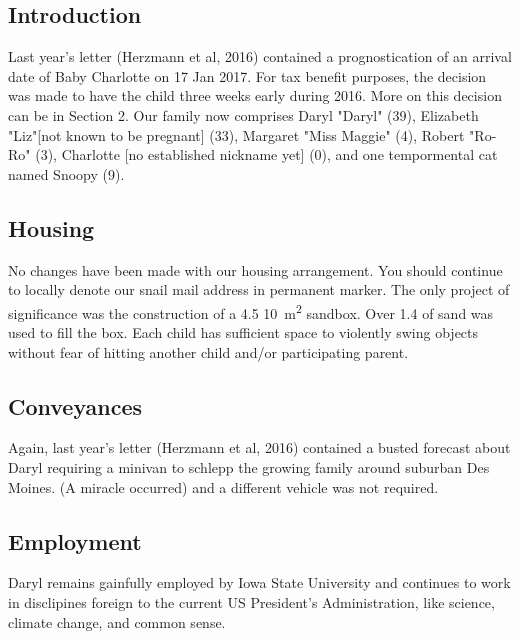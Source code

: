 \documentclass[letterpaper,11pt]{article}
\begin{document}
\begin{multicols}{2}

\section{Introduction} 

Last year's letter (Herzmann et al, 2016) contained a prognostication of an
arrival date of Baby Charlotte on 17 Jan 2017.  For tax benefit purposes, the
decision was made to have the child three weeks early during 2016. More on this
decision can be in Section 2. Our family now comprises Daryl "Daryl" (39),
Elizabeth "Liz"[not known to be pregnant] (33), Margaret "Miss Maggie" (4),
Robert "Ro-Ro" (3), Charlotte [no established nickname yet] (0), and one
tempormental cat named Snoopy (9).

\subsection{Housing}

No changes have been made with our housing arrangement. You should continue
to locally denote our snail mail address in permanent marker. The only project
of significance was the construction of a 4.5 \SI{10}{m^{2}} sandbox. Over 1.4
 of sand was used to fill the box.  Each child has sufficient space to
violently swing objects without fear of hitting another child and/or
participating parent.

\subsection{Conveyances}

Again, last year's letter (Herzmann et al, 2016) contained a busted forecast
about Daryl requiring a minivan to schlepp the growing family around suburban
Des Moines. (A miracle occurred) and a different vehicle was not required.

\subsection{Employment}
Daryl remains gainfully employed by Iowa State University and continues to
work in disclipines foreign to the current US President's Administration, like
science, climate change, and common sense.


\end{multicols}
\end{document}
